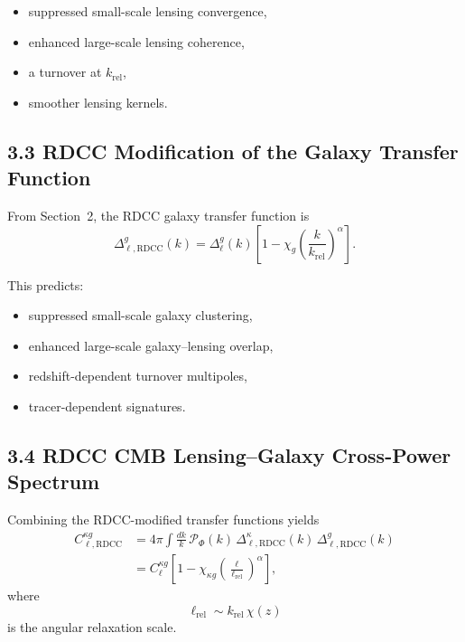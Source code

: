 \documentclass[11pt,a4paper]{article}
\begin{document}
\begin{itemize}
    \item suppressed small-scale lensing convergence,
    \item enhanced large-scale lensing coherence,
    \item a turnover at $k_{\mathrm{rel}}$,
    \item smoother lensing kernels.
\end{itemize}

\subsection*{3.3 RDCC Modification of the Galaxy Transfer Function}

From Section~2, the RDCC galaxy transfer function is
\begin{equation}
    \Delta_{\ell,\mathrm{RDCC}}^{g}(k)
    = \Delta_{\ell}^{g}(k)
      \left[
        1 - \chi_{g}
        \left(\frac{k}{k_{\mathrm{rel}}}\right)^{\alpha}
      \right].
\end{equation}

This predicts:

\begin{itemize}
    \item suppressed small-scale galaxy clustering,
    \item enhanced large-scale galaxy–lensing overlap,
    \item redshift-dependent turnover multipoles,
    \item tracer-dependent signatures.
\end{itemize}

\subsection*{3.4 RDCC CMB Lensing–Galaxy Cross-Power Spectrum}

Combining the RDCC-modified transfer functions yields
\begin{align}
    C_{\ell,\mathrm{RDCC}}^{\kappa g}
    &= 4\pi \int \frac{dk}{k}\,
       \mathcal{P}_{\Phi}(k)\,
       \Delta_{\ell,\mathrm{RDCC}}^{\kappa}(k)\,
       \Delta_{\ell,\mathrm{RDCC}}^{g}(k) \\
    &= C_{\ell}^{\kappa g}
       \left[
         1 - \chi_{\kappa g}
         \left(\frac{\ell}{\ell_{\mathrm{rel}}}\right)^{\alpha}
       \right],
\end{align}
where
\begin{equation}
    \ell_{\mathrm{rel}}
    \sim k_{\mathrm{rel}}\,\chi(z)
\end{equation}
is the angular relaxation scale.
\end{document}
